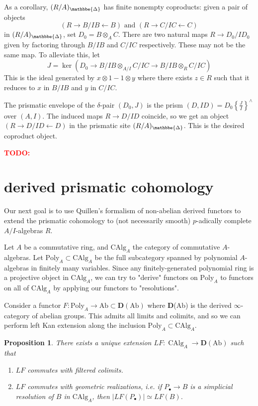 \documentclass[12pt]{amsproc}
\newtheorem*{prop}{Proposition}
\theoremstyle{definition}
\newcommand{\tensor}{\otimes}
\newcommand{\sma}{\wedge}
\newcommand{\htpyeq}{\simeq}
\newcommand{\ra}{\rightarrow}
\DeclareMathOperator{\prism}{\mathbbe{\Delta}}
\newcommand{\todo}[1]{\textcolor{red}{\textbf{TODO:}\text{[#1]}}}
\begin{document}
As a corollary, $(R/A)_{\prism}$ has finite nonempty coproducts: given a pair of objects 
\[(R\ra B/IB\leftarrow B)\text{  and  }(R\ra C/IC\leftarrow C)\]
in $(R/A)_{\prism}$, set $D_0=B\tensor_A C$. There are two natural maps $R\ra D_0/ID_0$ given by factoring through $B/IB$ and $C/IC$ respectively. These may not be the same map. To alleviate this, let
\[	J=\ker(D_0\ra B/IB\otimes_{A/I} C/IC\ra B/IB\otimes_R C/IC)	\]
This is the ideal generated by $x\tensor 1-1\tensor y$ where there exists $z\in R$ such that it reduces to $x$ in $B/IB$ and $y$ in $C/IC$.

The prismatic envelope of the $\delta$-pair $(D_0,J)$ is the prism $(D,ID)=D_0\left\{\frac{J}{I}\right\}^{\sma}$ over $(A,I)$. The induced maps $R\ra D/ID$ coincide, so we get an object $(R\ra D/ID\leftarrow D)$ in the prismatic site $(R/A)_{\prism}$. This is the desired coproduct object.

\todo{put in rest later}

\section{derived prismatic cohomology}

Our next goal is to use Quillen's formalism of non-abelian derived functors to extend the prismatic cohomology to (not necessarily smooth) $p$-adically complete $A/I$-algebras $R$. 

Let $A$ be a commutative ring, and $\text{CAlg}_A$ the category of commutative $A$-algebras. Let $\text{Poly}_A\subset\text{CAlg}_A$ be the full subcategory spanned by polynomial $A$-algebras in finitely many variables. Since any finitely-generated polynomial ring is a projective object in $\text{CAlg}_A$, we can try to "derive" functors on $\text{Poly}_A$ to functors on all of $\text{CAlg}_A$ by applying our functors to "resolutions".

Consider a functor $F:\text{Poly}_A\ra \text{Ab}\subset \textbf{D}(\text{Ab})$ where \textbf{D}(Ab) is the derived $\infty$-category of abelian groups. This admits all limits and colimits, and so we can perform left Kan extension along the inclusion $\text{Poly}_A\subset\text{CAlg}_A$.

\begin{prop} There exists a unique extension $LF:\operatorname{CAlg}_A\ra\operatorname{\mathbf{D}(Ab)}$ such that
\begin{enumerate}
\item $LF$ commutes with filtered colimits.
\item $LF$ commutes with geometric realizations, i.e. if $P_{\bullet}\ra B$ is a simplicial resolution of $B$ in $\text{CAlg}_A$, then $|LF(P_{\bullet})|\htpyeq LF(B)$.
\end{enumerate}
\end{prop}
\end{document}
